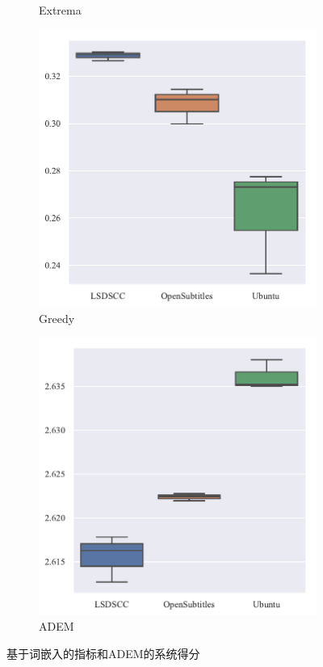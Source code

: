 \begin{figure}[H]
\begin{subfigure}{0.5\linewidth}
        \centering
        \caption{Extrema}
    \end{subfigure}
    \begin{subfigure}{0.5\linewidth}
        \includegraphics[width=\linewidth]{figure/boxplot/dataset/embedding_based_greedy_matching/plot.pdf}
        \centering
        \caption{Greedy}
    \end{subfigure}%
    \begin{subfigure}{0.5\linewidth}
        \includegraphics[width=\linewidth]{figure/boxplot/dataset/adem/plot.pdf}
        \centering
        \caption{ADEM}
        \label{subfig:ADEM_system}
    \end{subfigure}
    \caption{基于词嵌入的指标和ADEM的系统得分}
    \label{fig:ADEM_EB_system}
\end{figure}
